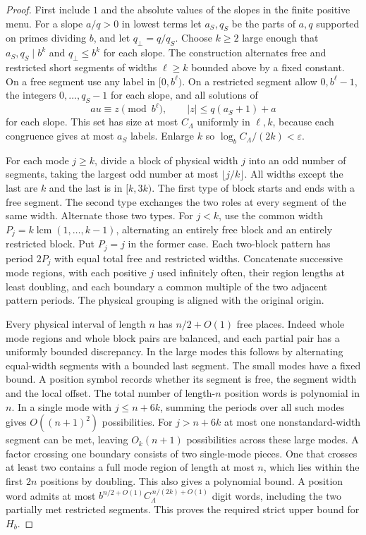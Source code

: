 \begin{proof}
First include \(1\) and the absolute values of the slopes in the finite positive menu. For a slope \(a/q>0\) in lowest terms let \(a_S,q_S\) be the parts of \(a,q\) supported on primes dividing \(b\), and let \(q_\perp=q/q_S\). Choose \(k\ge2\) large enough that \(a_S,q_S\mid b^k\) and \(q_\perp\le b^k\) for each slope. The construction alternates free and restricted short segments of widths \(\ell\ge k\) bounded above by a fixed constant. On a free segment use any label in \([0,b^\ell)\). On a restricted segment allow \(0,b^\ell-1\), the integers \(0,\ldots,q_S-1\) for each slope, and all solutions of
\begin{equation}\label{eq:entropy-allowed}
 au\equiv z\pmod{b^\ell},\qquad |z|\le q(a_S+1)+a
\end{equation}
for each slope. This set has size at most \(C_\Lambda\) uniformly in \(\ell,k\), because each congruence gives at most \(a_S\) labels. Enlarge \(k\) so \(\log_b C_\Lambda/(2k)<\varepsilon\).

For each mode \(j\ge k\), divide a block of physical width \(j\) into an odd number of segments, taking the largest odd number at most \(\lfloor j/k\rfloor\). All widths except the last are \(k\) and the last is in \([k,3k)\). The first type of block starts and ends with a free segment. The second type exchanges the two roles at every segment of the same width. Alternate those two types. For \(j<k\), use the common width \(P_j=k\operatorname{lcm}(1,\ldots,k-1)\), alternating an entirely free block and an entirely restricted block. Put \(P_j=j\) in the former case. Each two-block pattern has period \(2P_j\) with equal total free and restricted widths. Concatenate successive mode regions, with each positive \(j\) used infinitely often, their region lengths at least doubling, and each boundary a common multiple of the two adjacent pattern periods. The physical grouping is aligned with the original origin.

Every physical interval of length \(n\) has \(n/2+O(1)\) free places. Indeed whole mode regions and whole block pairs are balanced, and each partial pair has a uniformly bounded discrepancy. In the large modes this follows by alternating equal-width segments with a bounded last segment. The small modes have a fixed bound. A position symbol records whether its segment is free, the segment width and the local offset. The total number of length-\(n\) position words is polynomial in \(n\). In a single mode with \(j\le n+6k\), summing the periods over all such modes gives \(O((n+1)^2)\) possibilities. For \(j>n+6k\) at most one nonstandard-width segment can be met, leaving \(O_k(n+1)\) possibilities across these large modes. A factor crossing one boundary consists of two single-mode pieces. One that crosses at least two contains a full mode region of length at most \(n\), which lies within the first \(2n\) positions by doubling. This also gives a polynomial bound. A position word admits at most \(b^{n/2+O(1)}C_\Lambda^{\,n/(2k)+O(1)}\) digit words, including the two partially met restricted segments. This proves the required strict upper bound for \(H_b\).


\end{proof}
